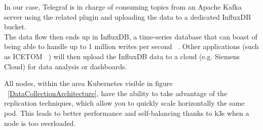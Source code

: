 \documentclass[]{IEEEtran}
\begin{document}
In our case, Telegraf is in charge of consuming topics from an Apache Kafka server using the related plugin and uploading the data to a dedicated InfluxDB bucket. 
\\

The data flow then ends up in InfluxDB, a time-series database that can boast of being able to handle up to 1 million writes per second ~\cite{influx}. Other applications (such as ICETOM ~\cite{icetom}) will then upload the InfluxDB data to a cloud (e.g. Siemens Cloud) for data analysis or dashboards.

All nodes, within the area Kubernetes visible in figure ~\ref{DataCollectionArchitecture}, have the ability to take advantage of the replication techniques, which allow you to quickly scale horizontally the same pod. This leads to better performance and self-balancing thanks to k3s when a node is too overloaded.
\end{document}
